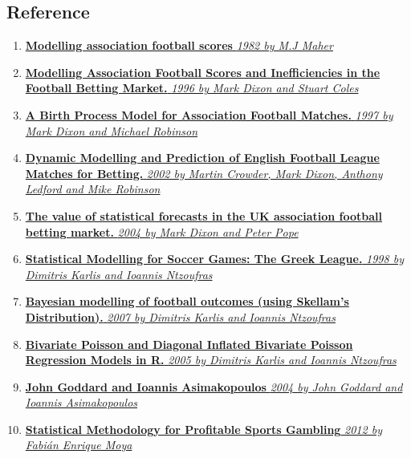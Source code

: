 \documentclass[article]{jss}
\providecommand{\tightlist}{%
  \setlength{\itemsep}{0pt}\setlength{\parskip}{0pt}}
\begin{document}
\subsection{Reference}\label{reference}

\begin{enumerate}
\def\labelenumi{\arabic{enumi}.}
\tightlist
\item
  \href{}{\textbf{Modelling association football scores} \emph{1982 by
  M.J Maher}}
\item
  \href{}{\textbf{Modelling Association Football Scores and
  Inefficiencies in the Football Betting Market.} \emph{1996 by Mark
  Dixon and Stuart Coles}}
\item
  \href{}{\textbf{A Birth Process Model for Association Football
  Matches.} \emph{1997 by Mark Dixon and Michael Robinson}}
\item
  \href{}{\textbf{Dynamic Modelling and Prediction of English Football
  League Matches for Betting.} \emph{2002 by Martin Crowder, Mark Dixon,
  Anthony Ledford and Mike Robinson}}
\item
  \href{}{\textbf{The value of statistical forecasts in the UK
  association football betting market.} \emph{2004 by Mark Dixon and
  Peter Pope}}
\item
  \href{}{\textbf{Statistical Modelling for Soccer Games: The Greek
  League.} \emph{1998 by Dimitris Karlis and Ioannis Ntzoufras}}
\item
  \href{}{\textbf{Bayesian modelling of football outcomes (using
  Skellam's Distribution).} \emph{2007 by Dimitris Karlis and Ioannis
  Ntzoufras}}
\item
  \href{}{\textbf{Bivariate Poisson and Diagonal Inflated Bivariate
  Poisson Regression Models in R.} \emph{2005 by Dimitris Karlis and
  Ioannis Ntzoufras}}
\item
  \href{}{\textbf{John Goddard and Ioannis Asimakopoulos} \emph{2004 by
  John Goddard and Ioannis Asimakopoulos}}
\item
  \href{}{\textbf{Statistical Methodology for Profitable Sports
  Gambling} \emph{2012 by Fabián Enrique Moya}}
\end{enumerate}
\end{document}
